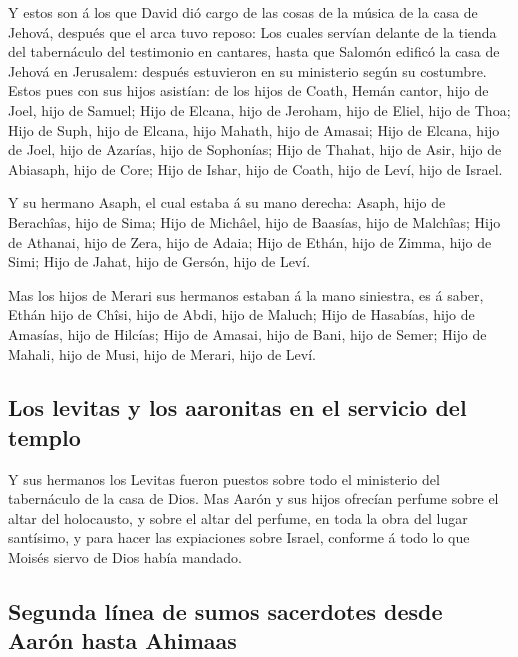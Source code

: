  Y estos son á los que David dió cargo de las cosas de la
música de la casa de Jehová, después que el arca tuvo reposo:
 Los cuales servían delante de la tienda del tabernáculo
del testimonio en cantares, hasta que Salomón edificó la casa de Jehová
en Jerusalem: después estuvieron en su ministerio según su costumbre.
 Estos pues con sus hijos asistían: de los hijos de
Coath, Hemán cantor, hijo de Joel, hijo de Samuel;  Hijo
de Elcana, hijo de Jeroham, hijo de Eliel, hijo de Thoa; 
Hijo de Suph, hijo de Elcana, hijo Mahath, hijo de Amasai;
 Hijo de Elcana, hijo de Joel, hijo de Azarías, hijo de
Sophonías;  Hijo de Thahat, hijo de Asir, hijo de
Abiasaph, hijo de Core;  Hijo de Ishar, hijo de Coath,
hijo de Leví, hijo de Israel.

 Y su hermano Asaph, el cual estaba á su mano derecha:
Asaph, hijo de Berachîas, hijo de Sima;  Hijo de Michâel,
hijo de Baasías, hijo de Malchîas;  Hijo de Athanai, hijo
de Zera, hijo de Adaia;  Hijo de Ethán, hijo de Zimma,
hijo de Simi;  Hijo de Jahat, hijo de Gersón, hijo de
Leví.

 Mas los hijos de Merari sus hermanos estaban á la mano
siniestra, es á saber, Ethán hijo de Chîsi, hijo de Abdi, hijo de
Maluch;  Hijo de Hasabías, hijo de Amasías, hijo de
Hilcías;  Hijo de Amasai, hijo de Bani, hijo de Semer;
 Hijo de Mahali, hijo de Musi, hijo de Merari, hijo de
Leví.

\hypertarget{los-levitas-y-los-aaronitas-en-el-servicio-del-templo}{%
\subsection{Los levitas y los aaronitas en el servicio del
templo}\label{los-levitas-y-los-aaronitas-en-el-servicio-del-templo}}

 Y sus hermanos los Levitas fueron puestos sobre todo el
ministerio del tabernáculo de la casa de Dios.  Mas Aarón
y sus hijos ofrecían perfume sobre el altar del holocausto, y sobre el
altar del perfume, en toda la obra del lugar santísimo, y para hacer las
expiaciones sobre Israel, conforme á todo lo que Moisés siervo de Dios
había mandado.

\hypertarget{segunda-luxednea-de-sumos-sacerdotes-desde-aaruxf3n-hasta-ahimaas}{%
\subsection{Segunda línea de sumos sacerdotes desde Aarón hasta
Ahimaas}\label{segunda-luxednea-de-sumos-sacerdotes-desde-aaruxf3n-hasta-ahimaas}}

